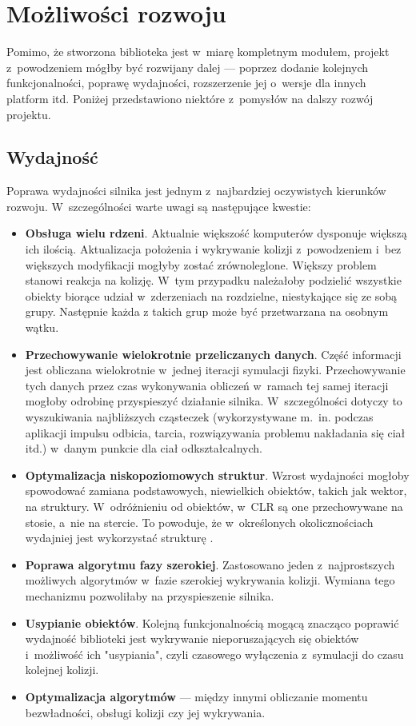 \section*{Możliwości rozwoju}
Pomimo, że stworzona biblioteka jest w~miarę kompletnym modułem, projekt z~powodzeniem mógłby być rozwijany dalej --- poprzez dodanie kolejnych funkcjonalności, poprawę wydajności, rozszerzenie jej o~wersje dla innych platform itd. Poniżej przedstawiono niektóre z~pomysłów na dalszy rozwój projektu.
\subsection*{Wydajność}
Poprawa wydajności silnika jest jednym z~najbardziej oczywistych kierunków rozwoju. W~szczególności warte uwagi są następujące kwestie:
\begin{itemize}
	\item \textbf{Obsługa wielu rdzeni}. Aktualnie większość komputerów dysponuje większą ich ilością. Aktualizacja położenia i wykrywanie kolizji z~powodzeniem i~bez większych modyfikacji mogłyby zostać zrównoleglone. Większy problem stanowi reakcja na kolizję. W~tym przypadku należałoby podzielić wszystkie obiekty biorące udział w~zderzeniach na rozdzielne, niestykające się ze sobą grupy. Następnie każda z takich grup może być przetwarzana na osobnym wątku.
	\item \textbf{Przechowywanie wielokrotnie przeliczanych danych}. Część informacji jest obliczana wielokrotnie w~jednej iteracji symulacji fizyki. Przechowywanie tych danych przez czas wykonywania obliczeń w~ramach tej samej iteracji mogłoby odrobinę przyspieszyć działanie silnika. W~szczególności dotyczy to wyszukiwania najbliższych cząsteczek (wykorzystywane m.~in. podczas aplikacji impulsu odbicia, tarcia, rozwiązywania problemu nakładania się ciał itd.) w~danym punkcie dla ciał odkształcalnych.
	\item \textbf{Optymalizacja niskopoziomowych struktur}. Wzrost wydajności mogłoby spowodować zamiana podstawowych, niewielkich obiektów, takich jak wektor, na struktury. W~odróżnieniu od obiektów, w~CLR są one przechowywane na stosie, a~nie na stercie. To powoduje, że w~określonych okolicznościach wydajniej jest wykorzystać strukturę \cite{bib:msdn-struct-vs-class}.
	\item \textbf{Poprawa algorytmu fazy szerokiej}. Zastosowano jeden z~najprostszych możliwych algorytmów w~fazie szerokiej wykrywania kolizji. Wymiana tego mechanizmu pozwoliłaby na przyspieszenie silnika.
	\item \textbf{Usypianie obiektów}. Kolejną funkcjonalnością mogącą znacząco poprawić wydajność biblioteki jest wykrywanie nieporuszających się obiektów i~możliwość ich "usypiania", czyli czasowego wyłączenia z~symulacji do czasu kolejnej kolizji. 
	\item \textbf{Optymalizacja algorytmów} --- między innymi obliczanie momentu bezwładności, obsługi kolizji czy jej wykrywania.
\end{itemize}


